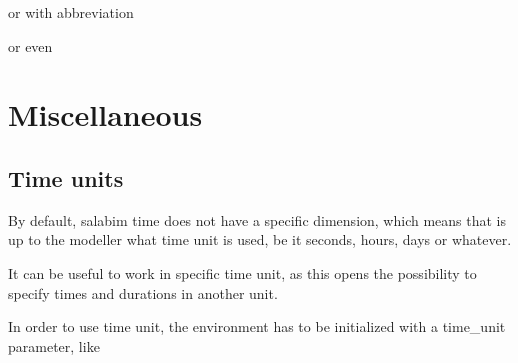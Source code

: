 \documentclass[letterpaper,10pt,english]{sphinxmanual}
\begin{document}
\begin{sphinxVerbatim}[commandchars=\\\{\}]
\end{sphinxVerbatim}

or with abbreviation

\begin{sphinxVerbatim}[commandchars=\\\{\}]
\end{sphinxVerbatim}

or even

\begin{sphinxVerbatim}[commandchars=\\\{\}]
\end{sphinxVerbatim}


\chapter{Miscellaneous}
\label{\detokenize{Miscellaneous::doc}}\label{\detokenize{Miscellaneous:miscellaneous}}

\section{Time units}
\label{\detokenize{Miscellaneous:time-units}}
By default, salabim time does not have a specific dimension, which means that is up to
the modeller what time unit is used, be it seconds, hours, days or whatever.

It can be useful to work in specific time unit, as this opens the possibility to specify times and durations in another unit.

In order to use time unit, the environment has to be initialized with a time\_unit parameter, like

\begin{sphinxVerbatim}[commandchars=\\\{\}]
  
\end{sphinxVerbatim}
\end{document}
